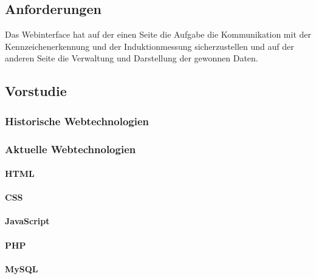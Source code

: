\subsection{Anforderungen}
Das Webinterface hat auf der einen Seite die Aufgabe die Kommunikation mit der
Kennzeichenerkennung und der Induktionmessung sicherzustellen und auf der
anderen Seite die Verwaltung und Darstellung der gewonnen Daten.

\subsection{Vorstudie}

\subsubsection{Historische Webtechnologien}

\subsubsection{Aktuelle Webtechnologien}
\paragraph{HTML}
\paragraph{CSS}
\paragraph{JavaScript}
\paragraph{PHP}
\paragraph{MySQL}